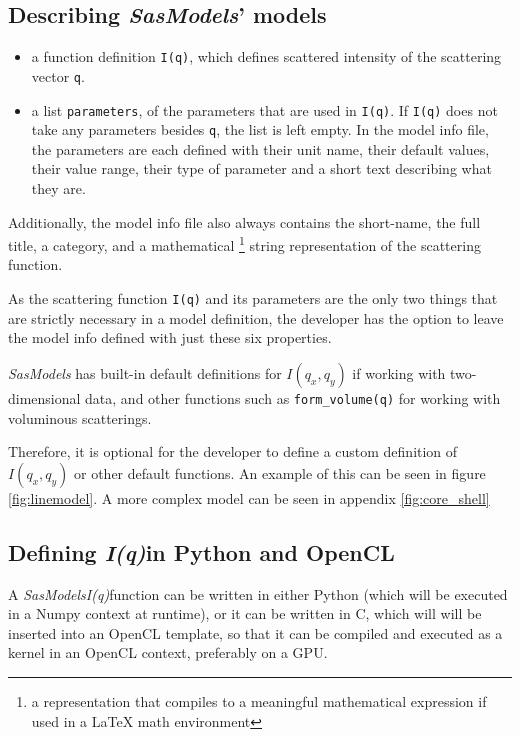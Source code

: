 \documentclass[11pt]{article}
\newcommand{\sasmodels}{\textit{SasModels}}
\newcommand{\iq}{\textit{I(q)}}
\begin{document}
\subsection{Describing \sasmodels' models}
\begin{itemize}
  \item a function definition \texttt{I(q)}, which defines scattered intensity 
  of the scattering vector \texttt{q}.

  \item a list \texttt{parameters}, of the parameters that are used in 
  \texttt{I(q)}. If \texttt{I(q)} does not take any parameters besides 
  \texttt{q}, the list is left empty.
  In the model info file, the parameters are each defined with their unit name, 
  their default values, their value range, their type of parameter and
  a short text describing what they are.
\end{itemize}

Additionally, the model info file also always contains the short-name, 
the full title, a category, and a mathematical \footnote{a representation 
that compiles to a meaningful mathematical expression if used in a LaTeX math 
environment} string representation of the scattering function.

As the scattering function \texttt{I(q)} and its parameters are the only 
two things that are strictly necessary in a model definition, the developer
has the option to leave the model info defined with just these six properties.

\sasmodels{} has built-in default definitions for $I(q_x,q_y)$ if working
with two-dimensional data, and other functions such as \texttt{form\_volume(q)}
for working with voluminous scatterings.

Therefore, it is optional for the developer to define a custom definition
of $I(q_x, q_y)$ or other default functions.
An example of this can be seen in figure \ref{fig:linemodel}.
A more complex model can be seen in appendix \ref{fig:core_shell}

\subsection{Defining \iq in Python and OpenCL}
A \sasmodels \iq function can be written in either Python (which will be
executed in a Numpy context at runtime), or it can be written in C, which will
will be inserted into an OpenCL template, so that it can be compiled and 
executed as a kernel in an OpenCL context, preferably on a GPU.
\end{document}

